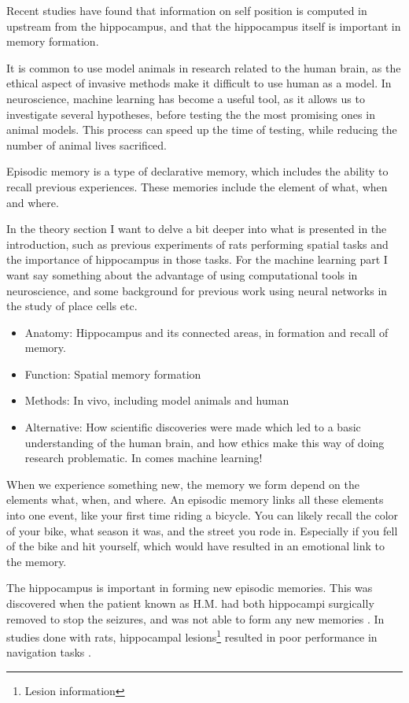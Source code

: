 Recent studies have found that information on self position is computed in upstream from the hippocampus, and that the hippocampus itself is important in memory formation.

It is common to use model animals in research related to the human brain, as the ethical aspect of invasive methods make it difficult to use human as a model. In neuroscience, machine learning has become a useful tool, as it allows us to investigate several hypotheses, before testing the the most promising ones in animal models. This process can speed up the time of testing, while reducing the number of animal lives sacrificed.

Episodic memory is a type of declarative memory, which includes the ability to recall previous experiences. These memories include the element of what, when and where.


In the theory section I want to delve a bit deeper into what is presented in 
the introduction, such as previous experiments of rats performing spatial 
tasks and the importance of hippocampus in those tasks. For the machine 
learning part I want say something about the advantage of using computational 
tools in neuroscience, and some background for previous work using neural 
networks in the study of place cells etc.
\begin{itemize}
    \item Anatomy: Hippocampus and its connected areas, in formation and recall of memory.
    \item Function: Spatial memory formation
    \item Methods: In vivo, including model animals and human
    \item Alternative: How scientific discoveries were made which led to a basic understanding of the human brain, and how ethics make this way of doing research problematic. In comes machine learning!
\end{itemize}
When we experience something new, the memory we form depend on the elements what, when, and where. An episodic memory links all these elements into one event, like your first time riding a bicycle. You can likely recall the color of your bike, what season it was, and the street you rode in. Especially if you fell of the bike and hit yourself, which would have resulted in an emotional link to the memory.

The hippocampus is important in forming new episodic memories. This was discovered when the patient known as H.M. had both hippocampi surgically removed to stop the seizures, and was not able to form any new memories \cite{scoville:1957:loss_recent}. In studies done with rats, hippocampal lesions\footnote{Lesion information} resulted in poor performance in navigation tasks \cite{kaada:1961:maze, schlesiger:2013:hippocampal_activation_maze}. 

